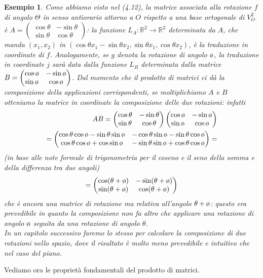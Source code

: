 \documentclass{book}
\newtheorem{esempio}{Esempio}
\begin{document}
\begin{esempio}
  Come abbiamo visto nel (4.12), la matrice associata alla rotazione $f$ di angolo $\Theta$ in
   senso antiorario attorno a $O$ rispetto a una base ortogonale di $V_O^2$ è $A =
   \begin{pmatrix}
     \cos\theta & -\sin \theta\\
     \sin\theta & \cos \theta
   \end{pmatrix}
   $: la funzione $L_A:\mathbb{R}^2\to \mathbb{R}^2$ determinata da $A$, che manda $(x_1,x_2)$ in
   $(\cos \theta x_1-\sin\theta x_2,\sin\theta x_1,\cos\theta x_2)$, è la traduzione in coordinate
   di $f$. Analogamente, se $g$ denota la rotazione di angolo $\clock$, la traduzione in
   coordinate $j$ sarà data dalla funzione $L_B$ determinata dalla matrice $B=
   \begin{pmatrix}
     \cos\clock & -\sin\clock \\
     \sin \clock & \cos\clock
   \end{pmatrix}
   $. Dal momento che il prodotto di matrici ci dà la composizione della applicazioni
   corrispondenti, se moltiplichiamo $A$ e $B$ otteniamo la matrice in coordinate la
   composizione delle due rotazioni: infatti
   \begin{eqnarray*}
     AB=
     \begin{pmatrix}
       \cos\theta &-\sin\theta\\
       \sin\theta& \cos\theta
     \end{pmatrix}
     \begin{pmatrix}
       \cos\clock&-\sin\clock\\
       \sin\clock & \cos \clock
     \end{pmatrix}\\
     =
     \begin{pmatrix}
       \cos\theta\cos\clock-\sin\theta\sin\clock &-\cos\theta\sin\clock-\sin\theta\cos\clock\\
       \cos\theta \cos\clock+\cos\sin\clock & -\sin\theta\sin\clock+\cos\theta\cos\clock
     \end{pmatrix}=
   \end{eqnarray*}
   (in base alle note formule di trigonometria per il coseno e il seno della somma e della
   differenza tra due angoli)
   \begin{equation*}
     =
     \begin{pmatrix}
       \cos(\theta+\clock) &-\sin(\theta+\clock)\\
       \sin(\theta+\clock) & \cos(\theta+\clock)
     \end{pmatrix}
   \end{equation*}
   che è ancora una matrice di rotazione ma relativa all'angolo $\theta+\clock$: questo era
   prevedibile in quanto la composizione non fa altro che applicare una rotazione di angolo
   $\clock$ seguita da una rotazione di angolo $\theta$.\\
   In un capitolo successivo faremo lo stesso per calcolare la composizione di due rotazioni
   nello spazio, dove il risultato è molto meno prevedibile e intuitivo che nel caso del piano.
\end{esempio}
Vediamo ora le proprietà fondamentali del prodotto di matrici.
\end{document}
